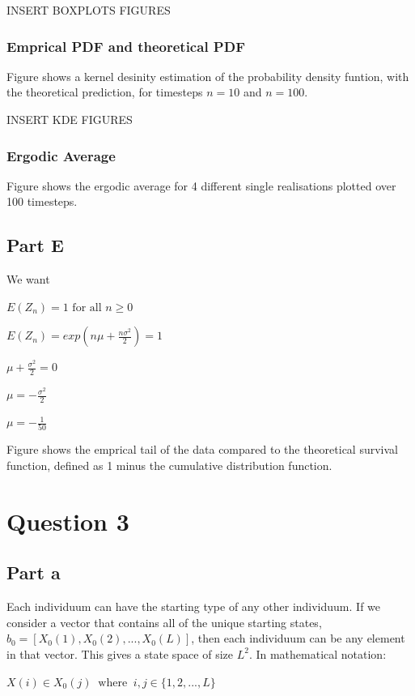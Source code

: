 \documentclass{article}
\begin{document}
INSERT BOXPLOTS FIGURES

\subsubsection{Emprical PDF and theoretical PDF}
Figure shows a kernel desinity estimation of the probability density funtion, with the theoretical prediction, for timesteps $n=10$ and $n=100$. 

INSERT KDE FIGURES

\subsubsection{Ergodic Average}
Figure shows the ergodic average for 4 different single realisations plotted over 100 timesteps. 

\subsection{Part E}

We want 

$E(Z_n) = 1 \text{ for all } n\geq0$

$E(Z_n) = exp(n\mu + \frac{n\sigma^2}{2}) = 1$

$\mu + \frac{\sigma^2}{2} = 0$

$\mu = - \frac{\sigma^2}{2}$

$\mu = -\frac{1}{50}$

Figure shows the emprical tail of the data compared to the theoretical survival function, defined as 1 minus the cumulative distribution function.




\section{Question 3}

\subsection{Part a}


Each individuum can have the starting type of any other individuum. If we consider a vector that contains all of the unique starting states, $b_0 = [X_0(1), X_0(2), . . . , X_0(L)]$, then each individuum can be any element in that vector. This gives a state space of size $L^2$. In mathematical notation:


$X(i) \in X_0(j) \ \text{ where } \ i,j \in \{1,2,...,L\}$ 
\end{document}
